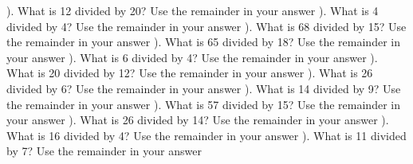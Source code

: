 \documentclass{article}%
\begin{document}
\newline%
\newline%
). What is 12 divided by 20? Use the remainder in your answer%
\newline%
\newline%
). What is 4 divided by 4? Use the remainder in your answer%
\newline%
\newline%
). What is 68 divided by 15? Use the remainder in your answer%
\newline%
\newline%
). What is 65 divided by 18? Use the remainder in your answer%
\newline%
\newline%
). What is 6 divided by 4? Use the remainder in your answer%
\newline%
\newline%
). What is 20 divided by 12? Use the remainder in your answer%
\newline%
\newline%
). What is 26 divided by 6? Use the remainder in your answer%
\newline%
\newline%
). What is 14 divided by 9? Use the remainder in your answer%
\newline%
\newline%
). What is 57 divided by 15? Use the remainder in your answer%
\newline%
\newline%
). What is 26 divided by 14? Use the remainder in your answer%
\newline%
\newline%
). What is 16 divided by 4? Use the remainder in your answer%
\newline%
\newline%
). What is 11 divided by 7? Use the remainder in your answer%
\newline%
\end{document}
